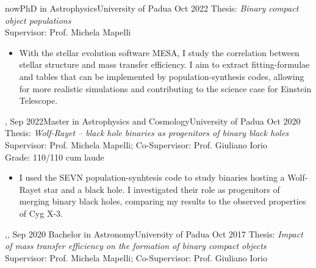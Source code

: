 %
%
%
\begin{experiences}
  \experiencetags
    {now}{PhD in Astrophysics}{University of Padua}
    {Oct 2022}
    {Thesis: \textit{Binary compact object populations} \\
    Supervisor: Prof. Michela Mapelli  }{
    \begin{itemize}
        \item  With the stellar evolution software MESA, I study the correlation between stellar structure and mass transfer efficiency. I aim to extract fitting-formulae and tables that can be implemented by population-synthesis codes, allowing for more realistic simulations and contributing to the science case for Einstein Telescope.
    \end{itemize}
   }{,}
  \emptySeparator
  \experiencetags
    {Sep 2022}{Master in Astrophysics and Cosmology}{University of Padua}
    {Oct 2020} 
    {Thesis: \textit{Wolf-Rayet -- black hole binaries as progenitors of binary black holes} \\
    Supervisor: Prof. Michela Mapelli; Co-Supervisor: Prof. Giuliano Iorio \\
    Grade: 110/110 cum laude %
    }{
    \begin{itemize}
        \item I used the SEVN population-synhtesis code to study binaries hosting a Wolf-Rayet star and a black hole. I investigated their role as progenitors of merging binary black holes, comparing my results to the observed properties of Cyg X-3. 
    \end{itemize}
    }{,,}
  \emptySeparator
  \experiencetags
    {Sep 2020}   {Bachelor in Astronomy}{University of Padua}
    {Oct 2017} 
    {Thesis: \textit{Impact of mass transfer efficiency on the formation of binary compact objects} \\
    Supervisor: Prof. Michela Mapelli; Co-Supervisor: Prof. Giuliano Iorio \\
}
\end{experiences}
